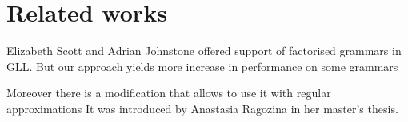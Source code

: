 \documentclass[runningheads,a4paper]{llncs}
\begin{document}
\section{Related works}%

Elizabeth Scott and Adrian Johnstone offered support of factorised grammars in GLL\cite{scott2016structuring}. 
But our approach yields more increase in performance on some grammars

Moreover there is a modification that allows to use it with regular approximations It was introduced by 
Anastasia Ragozina in her master's thesis.






\end{document}
